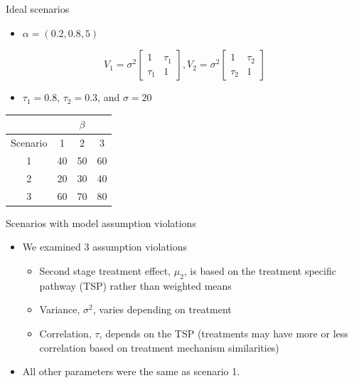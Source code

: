 \documentclass[pdftex]{beamer}
\begin{document}
\begin{frame}{Ideal scenarios}
\begin{itemize}
\item $\alpha = (0.2, 0.8, 5)$
\end{itemize}
$$ V_1 = \sigma^2
 \begin{bmatrix} 1 & \tau_1 \\
 \tau_1 & 1 \end{bmatrix},  V_2 = \sigma^2
 \begin{bmatrix} 1 & \tau_2 \\
 \tau_2 & 1 \end{bmatrix}
$$
\begin{itemize}
\item $\tau_1 = 0.8$, $\tau_2 = 0.3$, and $\sigma = 20$
\end{itemize}
\begin{center}
\begin{tabular}{c|ccc}\hline
& \multicolumn{3}{c}{$\beta$}  \\ \hline 
Scenario & 1 & 2 & 3  \\ \hline
1 & 40 & 50 & 60   \\
2 & 20 & 30 & 40  \\
3 & 60 & 70 & 80  \\ \hline
\end{tabular}
\end{center}
\end{frame}

\begin{frame}{Scenarios with model assumption violations}
\begin{itemize}
\item We examined 3 assumption violations
\begin{itemize}
\item Second stage treatment effect, $\mu_2$, is based on the treatment specific pathway (TSP) rather than weighted means
\item Variance, $\sigma^2$, varies depending on treatment
\item Correlation, $\tau$, depends on the TSP (treatments may have more or less correlation based on treatment mechanism similarities)
\end{itemize}
\item All other parameters were the same as scenario 1.
\end{itemize}
\end{frame}
\end{document}
